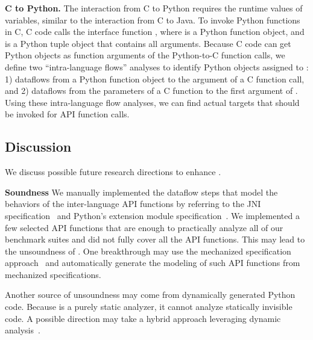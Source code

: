 \medskip

\textbf{C to Python.} The interaction from C to Python requires the runtime
values of variables, similar to the interaction from C to Java.  To invoke
Python functions in C, C code calls the interface function
, where  is a Python
function object, and  is a Python tuple object that contains all
arguments.  Because C code can get Python objects as function arguments of the
Python-to-C function calls, we define two ``intra-language flows'' analyses to
identify Python objects assigned to : 1) dataflows from a Python
function object to the argument of a C function call, and 2) dataflows from the
parameters of a C function to the first argument of
.  Using these intra-language flow analyses, we can
find actual targets that should be invoked for  API
function calls.

\subsection{Discussion}
We discuss possible future research directions to enhance \ours.

\textbf{Soundness} We manually implemented the dataflow steps that model the
behaviors of the inter-language API functions by referring to the JNI
specification~\cite{jnispec} and Python's extension module
specification~\cite{pythoncspec}.  We implemented a few selected API functions
that are enough to practically analyze all of our benchmark suites and did not
fully cover all the API functions.  This may lead to the unsoundness of \ours.
One breakthrough may use the mechanized specification
approach~\cite{jiset,jest,jstar,jsaver,justgen} and automatically generate the
modeling of such API functions from mechanized specifications.

Another source of unsoundness may come from dynamically generated Python code.
Because \ours is a purely static analyzer, it cannot analyze statically
invisible code.  A possible direction may take a hybrid approach leveraging
dynamic analysis~\cite{polycruise}.

